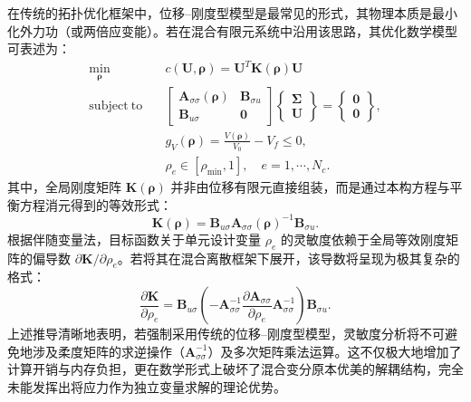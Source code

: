 在传统的拓扑优化框架中，位移--刚度型模型是最常见的形式，其物理本质是最小化外力功（或两倍应变能）。若在混合有限元系统中沿用该思路，其优化数学模型可表述为：
\[
\begin{aligned} 
	\min_{\boldsymbol{\rho}} \quad & c(\boldsymbol{U},\boldsymbol{\rho}) = \boldsymbol{U}^T\boldsymbol{K}(\boldsymbol{\rho})\boldsymbol{U} \\ 
	\mathrm{subject~to} \quad & 
	\begin{bmatrix}
		\boldsymbol{A}_{\sigma\sigma}(\boldsymbol{\rho}) & \boldsymbol{B}_{\sigma{u}}\\
		\boldsymbol{B}_{u\sigma} & \boldsymbol{0}
	\end{bmatrix}
	\begin{Bmatrix}
		\boldsymbol\Sigma\\
		\boldsymbol{U}
	\end{Bmatrix} =  
	\begin{Bmatrix}
		\boldsymbol{0}\\
		\boldsymbol{0}
	\end{Bmatrix},\\
	& g_V(\boldsymbol{\rho}) = \frac{V(\boldsymbol{\rho})}{V_0} - V_f \leq 0,\\ 
	& \rho_e \in [\rho_{\min}, 1],\quad{e}=1,\cdots,N_c.
\end{aligned}
\]
其中，全局刚度矩阵 $\boldsymbol{K}(\boldsymbol{\rho})$ 并非由位移有限元直接组装，而是通过本构方程与平衡方程消元得到的等效形式：
\[
\boldsymbol{K}(\boldsymbol{\rho}) = \boldsymbol{B}_{u\sigma}\boldsymbol{A}_{\sigma\sigma}(\boldsymbol{\rho})^{-1}\boldsymbol{B}_{\sigma{u}}.
\]
根据伴随变量法，目标函数关于单元设计变量 $\rho_e$ 的灵敏度依赖于全局等效刚度矩阵的偏导数 $\partial \boldsymbol{K} / \partial \rho_e$。若将其在混合离散框架下展开，该导数将呈现为极其复杂的格式：
\[
\frac{\partial \boldsymbol{K}}{\partial \rho_e} = \boldsymbol{B}_{u\sigma} \left( -\boldsymbol{A}_{\sigma\sigma}^{-1} \frac{\partial \boldsymbol{A}_{\sigma\sigma}}{\partial \rho_e} \boldsymbol{A}_{\sigma\sigma}^{-1} \right) \boldsymbol{B}_{\sigma u}.
\]
上述推导清晰地表明，若强制采用传统的位移--刚度型模型，灵敏度分析将不可避免地涉及柔度矩阵的求逆操作（$\boldsymbol{A}_{\sigma\sigma}^{-1}$）及多次矩阵乘法运算。这不仅极大地增加了计算开销与内存负担，更在数学形式上破坏了混合变分原本优美的解耦结构，完全未能发挥出将应力作为独立变量求解的理论优势。


